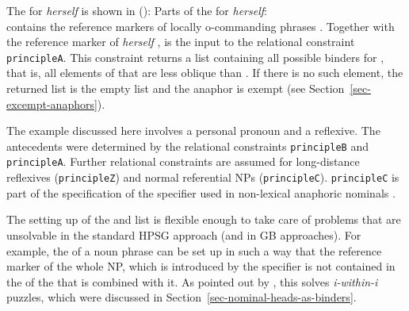 \documentclass[output=paper,biblatex,babelshorthands,newtxmath,draftmode,colorlinks,citecolor=brown]{langscibook}
\begin{document}
The \synsemv for \emph{herself} is shown in ():
\eas
Parts of the \synsemv for \emph{herself}:\\
\zs
\lista contains the reference markers of locally o-commanding phrases . Together with the
reference marker of \emph{herself} ,  is the input to the relational constraint
\texttt{principleA}. This constraint returns a list containing all possible binders for ,
that is, all elements of  that are less oblique than . If there is no such element,
the returned list is the empty list and the anaphor is exempt (see Section~\ref{sec-excempt-anaphors}).

The example discussed here involves a personal pronoun and a reflexive. The antecedents were
determined by the relational constraints \texttt{principleB} and \texttt{prin\-cipleA}. Further
relational constraints are assumed for long-distance reflexives (\texttt{principleZ}) and normal
referential NPs (\texttt{principleC}). \texttt{principleC} is part of the specification of the
specifier used in non-lexical anaphoric nominals \citep[]{Branco2002a}.

The setting up of the \lista and \listu list is flexible enough to take care of problems that are
unsolvable in the standard HPSG approach (and in GB approaches). For example, the \listul of a noun
phrase can be set up in such a way that the reference marker of the whole NP, which is introduced by
the specifier is not contained in the \listul of the \nbar that is combined with it. As pointed out
by \citet[]{Branco2002a}, this solves \emph{i-within-i} puzzles, which were discussed in Section~\ref{sec-nominal-heads-as-binders}.
\end{document}

